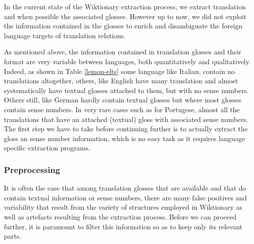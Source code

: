 \documentclass[10pt, a4paper]{article}
\begin{document}
In the current state of the Wiktionary extraction process, we extract translation and when possible the associated glosses. However up to now, we did not exploit the information contained in the glosses to enrich and disambiguate the foreign language targets of translation relations.


As mentioned above, the information contained in translation glosses and their format are very variable between languages, both quantitatively and qualitatively. Indeed, as shown in Table \ref{lemon-elts} some language like Italian, contain no translations altogether, others, like English have many translation and almost systematically have textual glosses attached to them, but with no sense numbers. Others still, like German hardly contain textual glosses but where most glosses contain sense numbers. In very rare cases such as for Portugese, almost all the translations that have an attached (textual) gloss with associated sense numbers. 
The first step we have to take before continuing further is to actually extract the gloss an sense number information, which is no easy task as it requires language specific extraction programs.
\subsubsection{Preprocessing}
It is often the case that among translation glosses that are available and that do contain textual information or sense numbers, there are many false positives and variability that result from the variety of structures employed in Wiktionary as well as artefacts resulting from the extraction process. Before we can proceed further, it is paramount to filter this information so as to keep only its relevant parts. 
\end{document}
